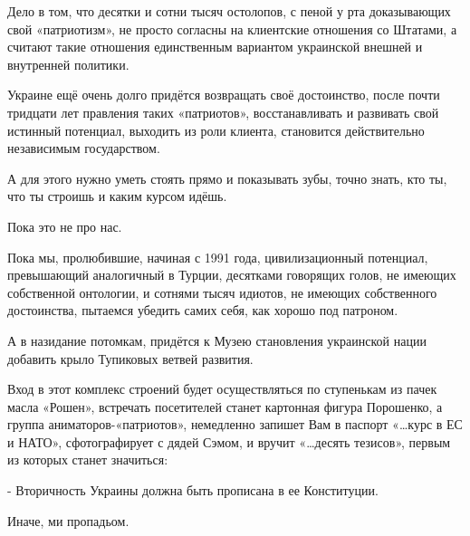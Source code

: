 Дело в том, что десятки и сотни тысяч  остолопов, с пеной у рта доказывающих
свой «патриотизм», не просто согласны на клиентские отношения со Штатами, а
считают такие отношения единственным вариантом украинской внешней и внутренней
политики.

Украине ещё очень долго придётся возвращать своё достоинство, после почти
тридцати лет правления таких «патриотов», восстанавливать и развивать свой
истинный потенциал, выходить из роли клиента, становится действительно
независимым государством. 

А для этого нужно уметь стоять прямо и показывать зубы, точно знать, кто ты, что ты строишь и каким курсом идёшь.

Пока это не про нас.

Пока мы, пролюбившие, начиная с 1991 года, цивилизационный потенциал,
превышающий аналогичный в Турции, десятками говорящих голов, не имеющих
собственной онтологии, и сотнями тысяч идиотов, не имеющих собственного
достоинства, пытаемся убедить самих себя, как хорошо под патроном. 

А в назидание потомкам, придётся к Музею становления украинской нации добавить
крыло Тупиковых ветвей развития.

Вход в этот комплекс строений будет осуществляться по ступенькам из пачек масла
«Рошен», встречать посетителей станет картонная фигура Порошенко, а группа
аниматоров-«патриотов», немедленно запишет Вам в паспорт «…курс в ЕС и НАТО»,
сфотографирует с дядей Сэмом, и вручит «…десять тезисов», первым из которых
станет значиться:

- Вторичность Украины должна быть прописана в ее Конституции.

Иначе, ми пропадьом.

